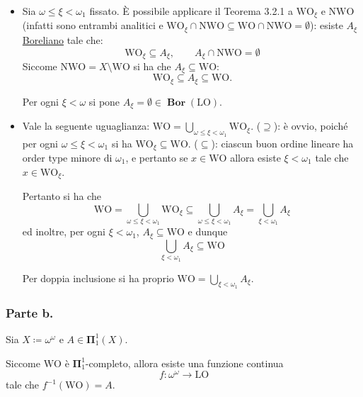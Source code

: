\documentclass{article}
\newcommand{\1}{\mathds{1}}
\begin{document}
\begin{itemize}
\item Sia \(\omega\le\xi< \omega_{1}\) fissato. È possibile applicare il Teorema 3.2.1 a \(\mathrm{WO}_{\xi}\)  e \(\mathrm{NWO}\) (infatti sono entrambi analitici e \(\mathrm{WO}_{\xi} \cap \mathrm{NWO} \subseteq \mathrm{WO} \cap \mathrm{NWO} =\emptyset\)): esiste \(A_{\xi}\) \uline{Boreliano} tale che:
\begin{equation*}
  \mathrm{WO}_{\xi} \subseteq A_{\xi}, \qquad A_{\xi} \cap \mathrm{NWO} = \emptyset
\end{equation*}
Siccome \(\mathrm{NWO} = X\setminus\mathrm{WO}\) si ha che \(A_{\xi} \subseteq \mathrm{WO}\):
\begin{equation*}
  \mathrm{WO}_{\xi} \subseteq A_{\xi} \subseteq \mathrm{WO}.
\end{equation*}

Per ogni \(\xi<\omega\) si pone \(A_{\xi} =\emptyset \in \bm{{\operatorname{Bor}}}(\mathrm{LO})\).
\item Vale la seguente uguaglianza: \(\mathrm{WO} = \bigcup_{\omega\le \xi<\omega_{1}} \mathrm{WO}_{\xi}\). (\(\supseteq\)): è ovvio, poiché per ogni \(\omega\le\xi<\omega_{1}\) si ha \(\mathrm{WO}_{\xi} \subseteq \mathrm{WO}\). (\(\subseteq\)): ciascun buon ordine lineare ha order type minore di \(\omega_{1}\), e pertanto se \(x \in \mathrm{WO}\) allora esiste \(\xi<\omega_{1}\) tale che \(x \in \mathrm{WO}_{\xi}\).

Pertanto si ha che
\begin{equation*}
  	\mathrm{WO} = \bigcup_{\omega\le \xi<\omega_{1}} \mathrm{WO}_{\xi} \subseteq \bigcup_{\omega\le \xi<\omega_{1}} A_{\xi} = \bigcup_{\xi<\omega_{1}} A_{\xi}
\end{equation*}
ed inoltre, per ogni \(\xi<\omega_{1}\), \(A_{\xi} \subseteq \mathrm{WO}\) e dunque
\begin{equation*}
  	\bigcup_{\xi<\omega_{1}} A_{\xi} \subseteq \mathrm{WO}
\end{equation*}

Per doppia inclusione si ha proprio \(\mathrm{WO} = \bigcup_{\xi<\omega_{1}} A_{\xi}\).
\end{itemize}
\subsubsection{Parte b.}
\label{sec:org1770568}

Sia \(X\coloneqq\omega^{\omega}\) e \(A \in \bm{\Pi}_{1}^{1}(X)\).

Siccome \(\mathrm{WO}\) è \(\bm{\Pi}_{1}^{1}\)-completo, allora esiste una funzione continua
\begin{equation*}
f: \omega^{\omega}\to \mathrm{LO}
\end{equation*}
tale che \(f^{-1}(\mathrm{WO}) = A\).
\end{document}
